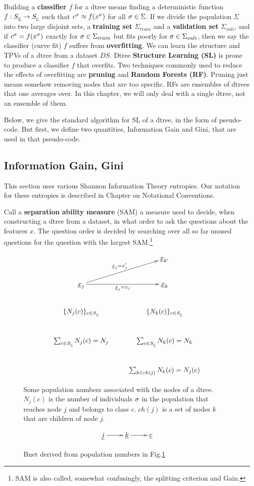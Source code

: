 Building a {\bf classifier $f$} for a dtree means
finding a deterministic
function $f:S_{\underline{x}}\rightarrow S_{\underline{c}}$ 
such that 
$c^\sigma \approx f(x^\sigma)$
for all $\sigma\in \Sigma$.
If we divide
the population
$\Sigma$ 
into two large 
disjoint
sets, a {\bf training set} $\Sigma_{train}$
and a {\bf validation set} $\Sigma_{vali}$,
and if $c^\sigma = f(x^\sigma)$ exactly
for $\sigma\in \Sigma_{train}$
but fits poorly
for $\sigma\in \Sigma_{vali}$,
then we say the classifier (curve fit) $f$
suffers from {\bf overfitting}.
We can learn the structure
and TPVs of a dtree from a dataset $DS$.
Dtree {\bf Structure Learning (SL)}
is prone to produce
a classifier $f$ that overfits.
Two techniques 
commonly used to 
reduce the effects of overfitting
are {\bf pruning}  and 
{\bf Random Forests (RF)}.
Pruning just means somehow
removing nodes that are
too specific. 
RFs are ensembles of dtrees 
that one averages over.
In this chapter, we will only deal
with a single dtree,
not an ensemble of them. 


Below,
we give the standard
algorithm for SL
of a dtree, in the form
of pseudo-code.
But first,
we define
two quantities,
Information Gain and
Gini,
that are 
used in that 
pseudo-code.



\subsection{Information Gain, Gini}
This section uses various Shannon Information Theory
entropies. Our 
notation for these
entropies
is described in Chapter 
on Notational Conventions.


Call a {\bf separation ability measure} (SAM)
a measure used 
to decide, when 
constructing a dtree from a dataset,
in what order 
to ask the questions
about the features $x$.
The question order is decided
by searching 
over all so far unused questions
for the question with 
the largest SAM.\footnote{SAM
is also called, somewhat
confusingly, the splitting
criterion and Gain.}



\begin{figure}[h!]
$$
\xymatrix{
&\rvx_{k'}
\\
\rvx_j\ar[r]_{\rvx_j=x_j}
\ar[ru]^{\rvx_j=x_j'}&\rvx_k
\\
\{N_j(c)\}_{c\in S_\rvc}
&
\{N_k(c)\}_{c\in S_\rvc}
\\
\sum_{c\in S_\rvc}N_j(c)=N_j
&
\sum_{c\in S_\rvc}N_k(c)=N_k
\\
&
\sum_{k\in ch(j)}N_k(c)=N_j(c)
}
$$
\caption{
Some population numbers associated
with the nodes of a dtree. $N_j(c)$ is the number
of individuals $\sigma$
in the population that reaches node $j$
and belongs to class $c$. 
$ch(j)$ is a set of nodes $k$ that are
children of node $j$.} 
\label{fig-dtree-notation}
\end{figure}
\begin{figure}[h!]
$$
\xymatrix{
\rvj
\ar[r]
&
\rvk\ar[r]
&
\rvc
}$$
\caption{Bnet derived from population
numbers in Fig.\ref{fig-dtree-notation}}
\label{fig-class-bnet}
\end{figure}



